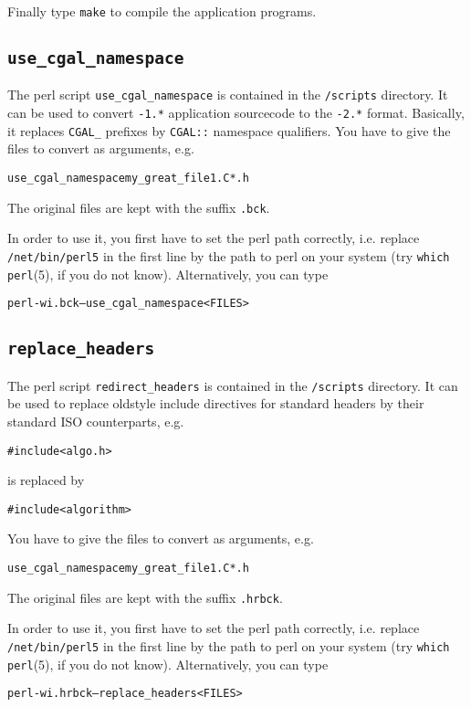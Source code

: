 Finally type \texttt{make} to compile the application programs.

\subsection{\texttt{use\_cgal\_namespace}}\label{sec:use_cgal_namespace}

The perl script \texttt{use\_cgal\_namespace} is contained in the
\cgaldir\texttt{/scripts} directory. It can be used to convert
\cgal\texttt{-1.*} application sourcecode to the \cgal\texttt{-2.*}
format.  Basically, it replaces \texttt{CGAL\_} prefixes by
\texttt{CGAL::} namespace qualifiers. You have to give the files to
convert as arguments, e.g.
\begin{alltt}
  use_cgal_namespace my_great_file1.C *.h
\end{alltt}
The original files are kept with the suffix \texttt{.bck}.

In order to use it, you first have to set the perl path correctly,
i.e. replace \texttt{/net/bin/perl5} in the first line by the path to
perl on your system (try \texttt{which perl}(5), if you do not know).
Alternatively, you can type
\begin{alltt}
  perl -wi.bck -- use_cgal_namespace <FILES>
\end{alltt}

\subsection{\texttt{replace\_headers}}\label{sec:replace_headers}

The perl script \texttt{redirect\_headers} is contained in the
\cgaldir\texttt{/scripts} directory. It can be used to replace
oldstyle include directives for standard headers by their standard ISO
counterparts, e.g.
\begin{alltt}
  #include <algo.h>
\end{alltt}
is replaced by
\begin{alltt}
  #include <algorithm>
\end{alltt}
You have to give the files to
convert as arguments, e.g.
\begin{alltt}
  use_cgal_namespace my_great_file1.C *.h
\end{alltt}
The original files are kept with the suffix \texttt{.hrbck}.

In order to use it, you first have to set the perl path correctly,
i.e. replace \texttt{/net/bin/perl5} in the first line by the path to
perl on your system (try \texttt{which perl}(5), if you do not know).
Alternatively, you can type
\begin{alltt}
  perl -wi.hrbck -- replace_headers <FILES>
\end{alltt}

\lcTex{\end{appendix}}



